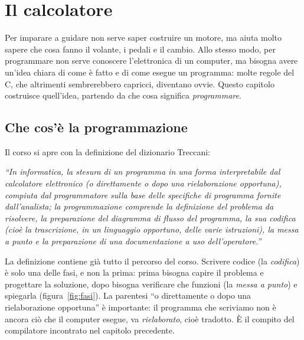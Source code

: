 \chapter{Il calcolatore}
\label{chap:calcolatore}

Per imparare a guidare non serve saper costruire un motore, ma aiuta molto
sapere che cosa fanno il volante, i pedali e il cambio. Allo stesso modo, per
programmare non serve conoscere l'elettronica di un computer, ma bisogna
avere un'idea chiara di come è fatto e di come esegue un programma: molte
regole del C, che altrimenti sembrerebbero capricci, diventano ovvie. Questo
capitolo costruisce quell'idea, partendo da che cosa significa
\textit{programmare}.

\section{Che cos'è la programmazione}

Il corso si apre con la definizione del dizionario Treccani:

\begin{center}
\begin{minipage}{0.86\linewidth}
\itshape “In informatica, la stesura di un programma in una forma
interpretabile dal calcolatore elettronico (o direttamente o dopo una
rielaborazione opportuna), compiuta dal programmatore sulla base delle
specifiche di programma fornite dall'analista; la programmazione comprende
la definizione del problema da risolvere, la preparazione del diagramma di
flusso del programma, la sua codifica (cioè la trascrizione, in un
linguaggio opportuno, delle varie istruzioni), la messa a punto e la
preparazione di una documentazione a uso dell'operatore.”
\end{minipage}
\end{center}

La definizione contiene già tutto il percorso del corso. Scrivere codice
(la \textit{codifica}) è solo una delle fasi, e non la prima: prima bisogna
capire il problema e progettare la soluzione, dopo bisogna verificare che
funzioni (la \textit{messa a punto}) e spiegarla (figura~\ref{fig:fasi}).
La parentesi “o direttamente o dopo una rielaborazione opportuna” è
importante: il programma che scriviamo non è ancora ciò che il computer
esegue, va \textit{rielaborato}, cioè tradotto. È il compito del
compilatore incontrato nel capitolo precedente.

